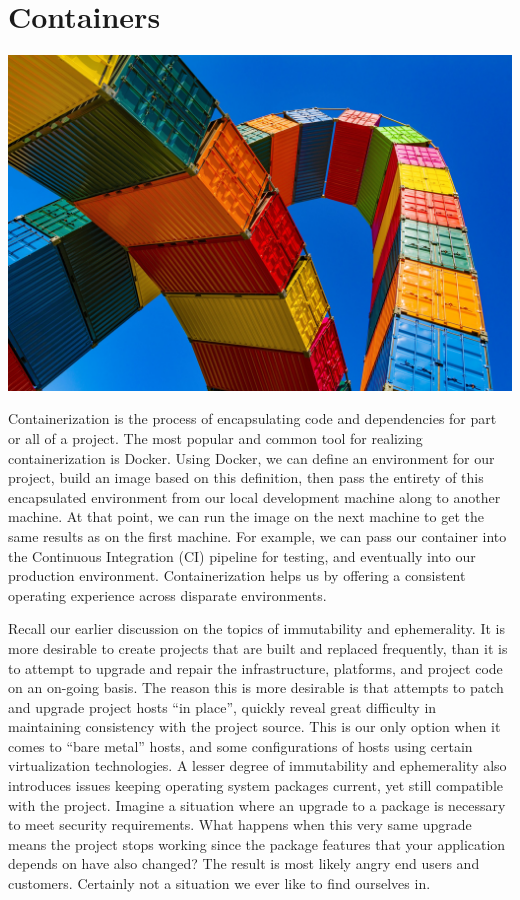 \chapter{Containers}

\includegraphics[scale=0.85]{../images/container-4203677_1920.jpg}


\justify{}
Containerization is the process of encapsulating code and dependencies for part
or all of a project. The most popular and common tool for realizing containerization is
Docker. Using Docker, we can define an environment for our project, build
an image based on this definition, then
pass the entirety of this encapsulated environment from our local development machine
along to another machine. At that point, we can run the image on the next machine to get
the same results as on the first machine. For example, we can pass our container
into the Continuous Integration (CI)
pipeline for testing, and eventually into our production environment. 
Containerization helps us by offering a consistent operating
experience across disparate environments.

\justify
Recall our earlier discussion on the topics of immutability
and ephemerality. It is more desirable to create projects that are built
and replaced frequently, than it is to attempt to upgrade and repair the infrastructure, 
platforms, and project code on an on-going basis. The reason this is more desirable 
is that attempts to patch and upgrade project hosts ``in place'', quickly reveal
great difficulty in maintaining consistency with the project source. This is our only
option when it comes  to ``bare metal'' hosts, and some configurations of hosts using
certain virtualization technologies. A lesser degree of immutability
and ephemerality also introduces issues keeping
operating system packages current, yet still compatible with
the project. Imagine a situation where an upgrade to a package
is necessary to meet security requirements. What happens when this very same
upgrade means the project stops working since the package
features that your application depends on have also changed?
The result is most likely angry end users and customers. Certainly not a situation
we ever like to find ourselves in.

